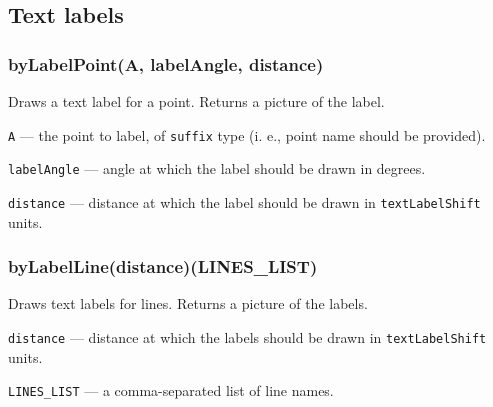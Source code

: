 \documentclass{ltxdoc}
\begin{document}




\subsection{Text labels}


\subsubsection{byLabelPoint(A, labelAngle, distance)}\label{byLabelPoint}
Draws a text label for a point. Returns a picture of the label.
	
	\texttt{A} — the point to label, of \texttt{suffix} type (i. e., point name should be provided).
	
	\texttt{labelAngle} — angle at which the label should be drawn in degrees.
	
	\texttt{distance} — distance at which the label should be drawn in \texttt{textLabelShift} units.

\subsubsection{byLabelLine(distance)(LINES\_LIST)}\label{byLabelLine}
	
	Draws text labels for lines. Returns a picture of the labels.
	
	\texttt{distance} — distance at which the labels should be drawn in \texttt{textLabelShift} units.
	
	\texttt{LINES\_LIST} — a comma-separated list of line names.
\end{document}
